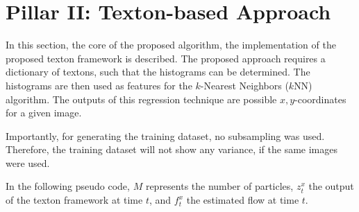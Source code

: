 \section{Pillar II: Texton-based Approach}
\label{sec:textons}

In this section, the core of the proposed algorithm, the
implementation of the proposed texton framework is described. The proposed approach requires a dictionary of textons, such that the histograms can be determined. The histograms are then used as features for the $k$-Nearest
Neighbors ($k$NN) algorithm. The outputs of this regression technique
are possible $x,y$-coordinates for a given image.


Importantly, for generating the training dataset, no subsampling was
used. Therefore, the training dataset will not show any variance, if
the same images were used.

In the following pseudo code, $M$ represents the number of particles,
$z_t^x$ the output of the texton framework at time $t$, and $f_t^x$
the estimated flow at time $t$.